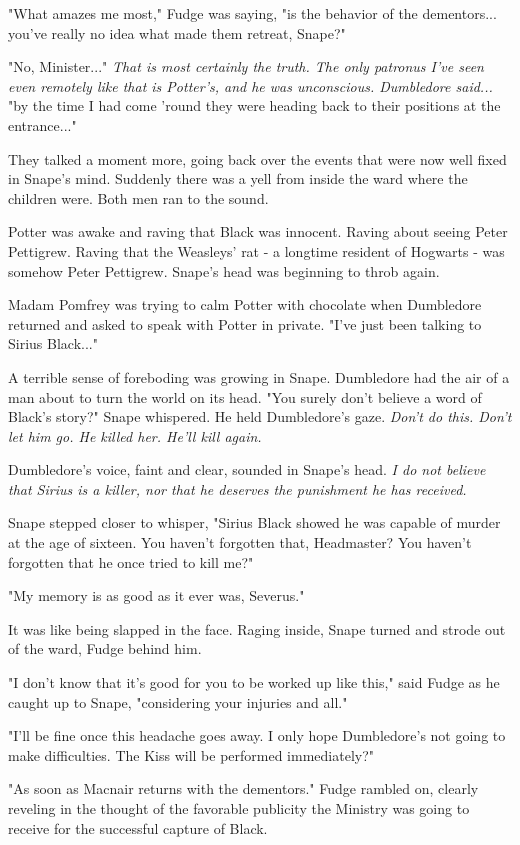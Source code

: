 "What amazes me most," Fudge was saying, "is the behavior of the dementors... you've really no idea what made them retreat, Snape?"

"No, Minister..." \emph{That is most certainly the truth. The only patronus I've seen even remotely like that is Potter's, and he was unconscious. Dumbledore said...} "by the time I had come 'round they were heading back to their positions at the entrance..."

They talked a moment more, going back over the events that were now well fixed in Snape's mind. Suddenly there was a yell from inside the ward where the children were. Both men ran to the sound.

Potter was awake and raving that Black was innocent. Raving about seeing Peter Pettigrew. Raving that the Weasleys' rat - a longtime resident of Hogwarts - was somehow Peter Pettigrew. Snape's head was beginning to throb again.

Madam Pomfrey was trying to calm Potter with chocolate when Dumbledore returned and asked to speak with Potter in private. "I've just been talking to Sirius Black..."

A terrible sense of foreboding was growing in Snape. Dumbledore had the air of a man about to turn the world on its head. "You surely don't believe a word of Black's story?" Snape whispered. He held Dumbledore's gaze. \emph{Don't do this. Don't let him go. He killed her. He'll kill again.}

Dumbledore's voice, faint and clear, sounded in Snape's head. \emph{I do not believe that Sirius is a killer, nor that he deserves the punishment he has received.}

Snape stepped closer to whisper, "Sirius Black showed he was capable of murder at the age of sixteen. You haven't forgotten that, Headmaster? You haven't forgotten that he once tried to kill me?"

"My memory is as good as it ever was, Severus."

It was like being slapped in the face. Raging inside, Snape turned and strode out of the ward, Fudge behind him.

"I don't know that it's good for you to be worked up like this," said Fudge as he caught up to Snape, "considering your injuries and all."

"I'll be fine once this headache goes away. I only hope Dumbledore's not going to make difficulties. The Kiss will be performed immediately?"

"As soon as Macnair returns with the dementors." Fudge rambled on, clearly reveling in the thought of the favorable publicity the Ministry was going to receive for the successful capture of Black.

